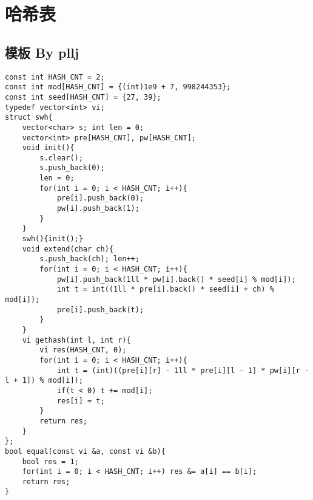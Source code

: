 \section{哈希表}
\subsection{模板 By pllj}
\begin{lstlisting}
const int HASH_CNT = 2;
const int mod[HASH_CNT] = {(int)1e9 + 7, 998244353};
const int seed[HASH_CNT] = {27, 39};
typedef vector<int> vi;
struct swh{
    vector<char> s; int len = 0;
    vector<int> pre[HASH_CNT], pw[HASH_CNT];
    void init(){
        s.clear();
        s.push_back(0);
        len = 0;
        for(int i = 0; i < HASH_CNT; i++){
            pre[i].push_back(0);
            pw[i].push_back(1);
        }
    }
    swh(){init();}
    void extend(char ch){
        s.push_back(ch); len++;
        for(int i = 0; i < HASH_CNT; i++){
            pw[i].push_back(1ll * pw[i].back() * seed[i] % mod[i]);
            int t = int((1ll * pre[i].back() * seed[i] + ch) % mod[i]);
            pre[i].push_back(t);
        }
    }
    vi gethash(int l, int r){
        vi res(HASH_CNT, 0);
        for(int i = 0; i < HASH_CNT; i++){
            int t = (int)((pre[i][r] - 1ll * pre[i][l - 1] * pw[i][r - l + 1]) % mod[i]);
            if(t < 0) t += mod[i];
            res[i] = t;
        }
        return res;
    }
};
bool equal(const vi &a, const vi &b){
    bool res = 1;
    for(int i = 0; i < HASH_CNT; i++) res &= a[i] == b[i];
    return res;
}
\end{lstlisting}